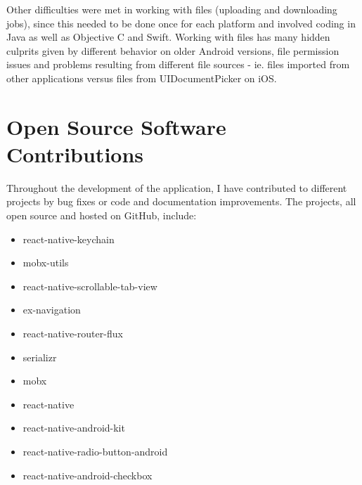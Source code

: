 Other difficulties were met in working with files (uploading and downloading jobs), since this needed to be done once for each platform and involved coding in Java as well as Objective C and Swift. Working with files has many hidden culprits given by different behavior on older Android versions, file permission issues and problems resulting from different file sources - ie. files imported from other applications versus files from UIDocumentPicker on iOS.


\section{Open Source Software Contributions}

Throughout the development of the application, I have contributed to different projects by bug fixes or code and documentation improvements. The projects, all open source and hosted on GitHub, include: 


\begin{itemize}
\item react-native-keychain
\item mobx-utils
\item react-native-scrollable-tab-view
\item ex-navigation
\item react-native-router-flux
\item serializr
\item mobx
\item react-native
\item react-native-android-kit
\item react-native-radio-button-android
\item react-native-android-checkbox
\end{itemize}



